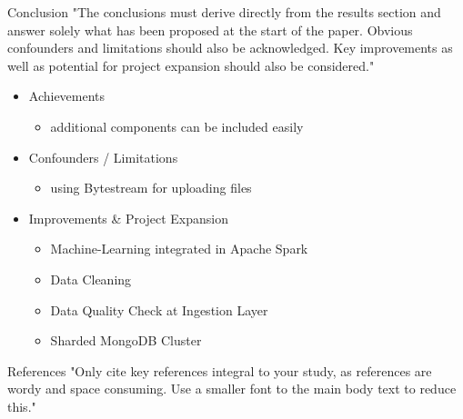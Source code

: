\documentclass[12pt]{beamer}
\begin{document}
\begin{textblock}{0.5}
\begin{block}{Conclusion}
"The conclusions must derive directly from the results section and answer solely what has been proposed at the start of the paper. Obvious confounders and limitations should also be acknowledged. Key improvements as well as potential for project expansion should also be considered."
\begin{itemize}
\item Achievements
\begin{itemize}
\item additional components can be included easily
\end{itemize}
\item Confounders / Limitations
\begin{itemize}
\item using Bytestream for uploading files
\end{itemize}
\item Improvements \& Project Expansion
\begin{itemize}
\item Machine-Learning integrated in Apache Spark
\item Data Cleaning
\item Data Quality Check at Ingestion Layer
\item Sharded MongoDB Cluster
\end{itemize}
\end{itemize}
\end{block}

\vfill\vspace{7.5mm} %
\begin{block}{References}
"Only cite key references integral to your study, as references are wordy and space consuming. Use a smaller font to the main body text to reduce this."

\nocite{*}
\parbox{\textwidth}{
\AtNextBibliography{\small}
\printbibliography
}
\end{block}

\end{textblock}
\end{document}
